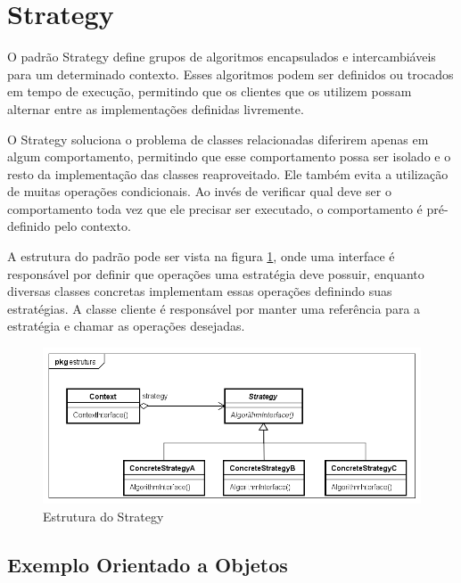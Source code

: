 \section{Strategy}


O padrão Strategy define grupos de algoritmos encapsulados e
intercambiáveis para um determinado contexto. Esses 
algoritmos podem ser definidos ou trocados em tempo de 
execução, permitindo que os clientes que os utilizem possam
alternar entre as implementações definidas livremente.
\cite{gamma:1995}

O Strategy soluciona o problema de classes relacionadas 
diferirem apenas em algum comportamento, permitindo que 
esse comportamento possa ser isolado e o resto da implementação 
das classes reaproveitado. Ele também evita a utilização de 
muitas operações condicionais. Ao invés de verificar qual 
deve ser o comportamento toda vez que ele precisar ser 
executado, o comportamento é pré-definido pelo contexto. 

A estrutura do padrão pode ser vista na figura \ref{strategy_struct}, 
onde uma interface é responsável por definir que operações 
uma estratégia deve possuir, enquanto diversas classes 
concretas implementam essas operações definindo suas 
estratégias. A classe cliente é responsável por manter 
uma referência para a estratégia e chamar as 
operações desejadas.

\begin{figure}[htb]
	\caption{\label{strategy_struct}Estrutura do Strategy}
	\begin{center}
	    \includegraphics[scale=0.5]{5_padroes-contexto-funcional/5.3_comportamentais/5.3.09_strategy/strategy_estrutura.png}
	\end{center}
\end{figure}

\subsection*{Exemplo Orientado a Objetos}

